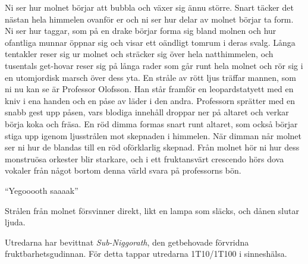 \begin{displayquote}
	Ni ser hur molnet börjar att bubbla och växer sig ännu större. Snart täcker det nästan hela himmelen ovanför er och ni ser hur delar av molnet börjar ta form. Ni ser hur taggar, som på en drake börjar forma sig bland molnen och hur ofantliga munnar öppnar sig och visar ett oändligt tomrum i deras svalg. Långa tentakler reser sig ur molnet och sträcker sig över hela natthimmelen, och tusentals get-hovar reser sig på långa rader som går runt hela molnet och rör sig i en utomjordisk marsch över dess yta. En stråle av rött ljus träffar mannen, som ni nu kan se är Professor Olofsson. Han står framför en leopardstatyett med en kniv i ena handen och en påse av läder i den andra. Professorn sprätter med en snabb gest upp påsen, vars blodiga innehåll droppar ner på altaret och verkar börja koka och fräsa. En röd dimma formas snart runt altaret, som också börjar stiga upp igenom ljusstrålen mot skepnaden i himmelen. När dimman når molnet ser ni hur de blandas till en röd oförklarlig skepnad. Från molnet hör ni hur dess monstruösa orkester blir starkare, och i ett fruktansvärt crescendo hörs dova vokaler från något bortom denna värld svara på professorns bön.
	\begin{center}
		``Yegooooth saaaak''
	\end{center}
	Strålen från molnet försvinner direkt, likt en lampa som släcks, och dånen slutar ljuda. 
\end{displayquote}
%
Utredarna har bevittnat \textit{Sub-Niggorath}, den getbehovade förvridna fruktbarhetsgudinnan. För detta tappar utredarna 1T10/1T100 i sinneshälsa.